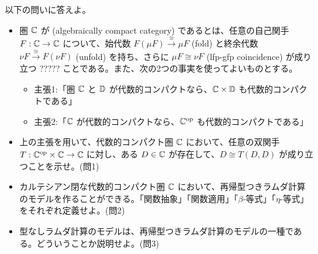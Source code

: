 \documentclass[
		head_space=20mm,
		foot_space=20mm,
		gutter=10mm,
		line_length=190mm
]{jlreq}
\begin{document}
\begin{practice}[再帰型つきラムダ計算のモデル]
	以下の問いに答えよ。
	\begin{itemize}
		\item 圏 $\mathbb{C}$ が (algebraically compact category) であるとは、任意の自己関手 $F:\mathbb{C}\to\mathbb{C}$ について、始代数 $F(\mu F)\xrightarrow{\cong} \mu F$ (fold) と終余代数 $\nu F\xrightarrow{\cong} F(\nu F)$ (unfold) を持ち、さらに $\mu F\cong\nu F$ (lfp-gfp coincidence) が成り立つ ????? ことである。また、次の2つの事実を使ってよいものとする。
		\begin{itemize}
			\item 主張1:「圏 $\mathbb{C}$ と $\mathbb{D}$ が代数的コンパクトなら、$\mathbb{C}\times \mathbb{D}$ も代数的コンパクトである」
			\item 主張2:「$\mathbb{C}$ が代数的コンパクトなら、$\mathbb{C}^{\mathrm{op}}$ も代数的コンパクトである」
		\end{itemize}
		\item 上の主張を用いて、代数的コンパクト圏 $\mathbb{C}$ において、任意の双関手 $T:\mathbb{C}^{\mathrm{op}}\times\mathbb{C}\to\mathbb{C}$ に対し、ある $D\in\mathbb{C}$ が存在して、$D\cong T(D,D)$ が成り立つことを示せ。(問1)
		\item カルテシアン閉な代数的コンパクト圏 $\mathbb{C}$ において、再帰型つきラムダ計算のモデルを作ることができる。「関数抽象」「関数適用」「$\beta$-等式」「$\eta$-等式」をそれぞれ定義せよ。(問2)
		\item 型なしラムダ計算のモデルは、再帰型つきラムダ計算のモデルの一種である。どういうことか説明せよ。(問3)
	\end{itemize}
\end{practice}





\end{document}
